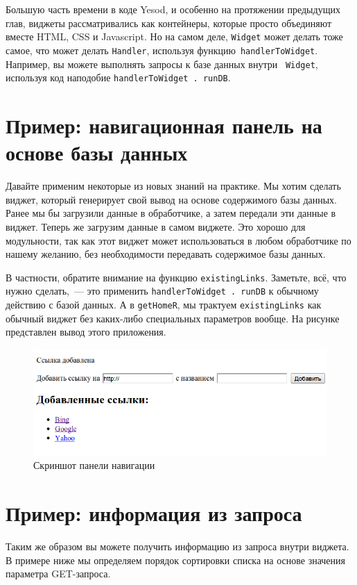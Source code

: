 Большую часть времени в коде Yesod, и особенно на протяжении предыдущих глав,
виджеты рассматривались как контейнеры, которые просто объединяют вместе HTML,
CSS и Javascript. Но на самом деле, \lstinline'Widget' может делать тоже самое,
что может делать \lstinline'Handler', используя
функцию~\lstinline'handlerToWidget'. Например, вы можете выполнять запросы
к базе данных внутри ~\lstinline'Widget', используя код наподобие
\lstinline'handlerToWidget . runDB'.

\section{Пример: навигационная панель на основе базы данных}
Давайте применим некоторые из новых знаний на практике. Мы хотим сделать виджет,
который генерирует свой вывод на основе содержимого базы данных. Ранее мы бы
загрузили данные в обработчике, а затем передали эти данные в виджет. Теперь же
загрузим данные в самом виджете. Это хорошо для модульности, так как этот виджет
может использоваться в любом обработчике по нашему желанию, без необходимости
передавать содержимое базы данных.


В частности, обратите внимание на функцию \lstinline'existingLinks'. Заметьте,
всё, что нужно сделать,~--- это применить \lstinline'handlerToWidget . runDB' к
обычному действию с базой данных. А в \lstinline'getHomeR', мы трактуем
\lstinline'existingLinks' как обычный виджет без каких-либо специальных
параметров вообще. На рисунке представлен вывод этого приложения.

\begin{figure}[tbh]
  \centering
  \includegraphics[scale=0.5]{yesods-monads/image.png}
  \caption{Скриншот панели навигации}
\end{figure}

\section{Пример: информация из запроса}
Таким же образом вы можете получить информацию из запроса внутри виджета. В
примере ниже мы определяем порядок сортировки списка на основе значения
параметра GET-запроса.

